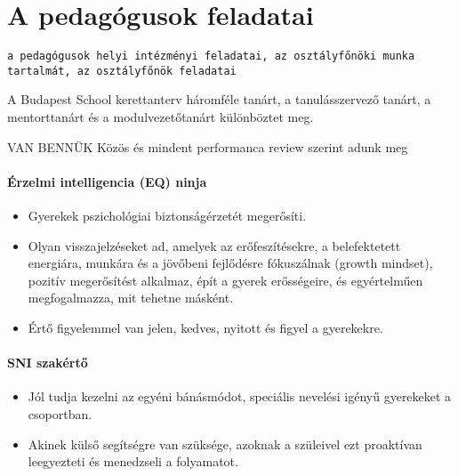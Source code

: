 


\section{A pedagógusok feladatai}\label{sec:tanarfeladatok}

\begin{verbatim}
a pedagógusok helyi intézményi feladatai, az osztályfőnöki munka tartalmát, az osztályfőnök feladatai
\end{verbatim}

A Budapest School kerettanterv háromféle tanárt, a tanulásszervező
tanárt, a mentorttanárt és a modulvezetőtanárt különböztet meg.

VAN BENNÜK Közös és mindent performanca review szerint adunk meg



\paragraph{Érzelmi intelligencia (EQ)
ninja}\label{uxe9rzelmi-intelligencia-eq-ninja}

\begin{itemize}

\item
  Gyerekek pszichológiai biztonságérzetét megerősíti.
\item
  Olyan visszajelzéseket ad, amelyek az erőfeszítésekre, a belefektetett
  energiára, munkára és a jövőbeni fejlődésre fókuszálnak (growth
  mindset), pozitív megerősítést alkalmaz, épít a gyerek erősségeire, és
  egyértelműen megfogalmazza, mit tehetne másként.
\item
  Értő figyelemmel van jelen, kedves, nyitott és figyel a gyerekekre.
\end{itemize}

\paragraph{SNI szakértő}\label{sni-szakuxe9rtux151}

\begin{itemize}

\item
  Jól tudja kezelni az egyéni bánásmódot, speciális nevelési igényű
  gyerekeket a csoportban.
\item
  Akinek külső segítségre van szüksége, azoknak a szüleivel ezt
  proaktívan leegyezteti és menedzseli a folyamatot.
\end{itemize}


